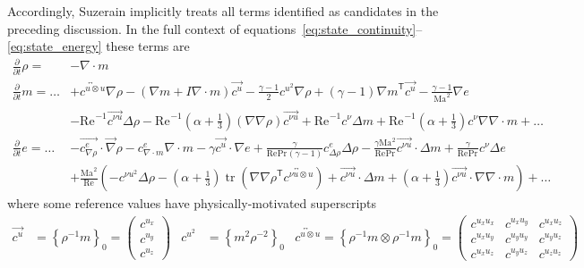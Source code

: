 \documentclass[letterpaper,11pt,nointlimits,reqno,draft]{amsart}
\newcommand{\trans}[1]{{#1}^{\ensuremath{\mathsf{T}}}}
\newcommand{\Mach}[1][]{\ensuremath{\mbox{Ma}_{#1}}}
\newcommand{\Reynolds}[1][]{\ensuremath{\mbox{Re}_{#1}}}
\newcommand{\Prandtl}[1][]{\ensuremath{\mbox{Pr}_{#1}}}
\newcommand{\reference}[1]{\ensuremath{\left\{#1\right\}_{0}}}
\DeclareMathOperator{\trace}{tr}
\begin{document}
Accordingly, Suzerain implicitly treats all terms identified as candidates
in the preceding discussion.  In the full context of
equations~\eqref{eq:state_continuity}--\eqref{eq:state_energy} these terms are
\begin{align}
  \frac{\partial}{\partial{}t} \rho{} = &-\nabla\cdot{}m
\\
  \frac{\partial}{\partial{}t} m = \dots
   &+ \overleftrightarrow{c^{u\otimes{}u}} \nabla\rho
    - \left(\nabla{}m+I\nabla\cdot{}m\right)\overrightarrow{c^u}
    - \frac{\gamma-1}{2} c^{u^2} \nabla\rho
    + \left(\gamma-1\right)\trans{\nabla{}m} \overrightarrow{c^u}
    - \frac{\gamma-1}{\Mach^2}\nabla{}e
\\
   &- \Reynolds^{-1} \overrightarrow{c^{\nu{}u}} \Delta\rho
    - \Reynolds^{-1} \left(\alpha+\frac{1}{3}\right) \left(\nabla\nabla\rho\right) \overrightarrow{c^{\nu{}u}}
    + \Reynolds^{-1} c^{\nu} \Delta{}m
    + \Reynolds^{-1} \left(\alpha+\frac{1}{3}\right)c^{\nu} \nabla\nabla\cdot{}m
    + \dots
\\
  \frac{\partial}{\partial{}t} e = \dots
   &- \overrightarrow{c^{e}_{\nabla\rho}} \cdot\vec{\nabla}\rho
    - c^{e}_{\nabla\cdot{}m} \nabla\cdot{}m
    - \gamma \overrightarrow{c^u}\cdot\nabla{}e
    + \frac{\gamma}{\Reynolds\Prandtl\left(\gamma-1\right)}
      c^{e}_{\Delta\rho} \Delta\rho
    - \frac{\gamma\Mach^{2}}{\Reynolds\Prandtl}
      \overrightarrow{c^{\nu{}u}}\cdot\Delta{}m
    + \frac{\gamma}{\Reynolds\Prandtl}c^{\nu}\Delta{}e
\\
   &+ \frac{\Mach^2}{\Reynolds}\left(
       - c^{\nu{}u^2}\Delta\rho
       - \left(\alpha+\frac{1}{3}\right)
         \trace\left(\trans{\nabla\nabla\rho}
                     \overleftrightarrow{c^{\nu{}u\otimes{}u}}\right)
       + \overrightarrow{c^{\nu{}u}}\cdot\Delta{}m
       + \left(\alpha+\frac{1}{3}\right)
         \overrightarrow{c^{\nu{}u}}\cdot\nabla\nabla\cdot{}m
   \right)
       + \dots
\end{align}
where some reference values have physically-motivated superscripts
\begin{align}
  \overrightarrow{c^{u}} &= \reference{\rho^{-1}m}
  = \begin{pmatrix} c^{u_x} \\ c^{u_y} \\ c^{u_z} \end{pmatrix}
&
  c^{u^2} &= \reference{m^{2}\rho^{-2}}
&
   \overleftrightarrow{c^{u\otimes{}u}}
  = \reference{\rho^{-1}m\otimes\rho^{-1}m}
  = \begin{pmatrix}
   c^{u_x u_x} & c^{u_x u_y} & c^{u_x u_z} \\
   c^{u_x u_y} & c^{u_y u_y} & c^{u_y u_z} \\
   c^{u_x u_z} & c^{u_y u_z} & c^{u_z u_z}
  \end{pmatrix}
\end{align}
\end{document}
